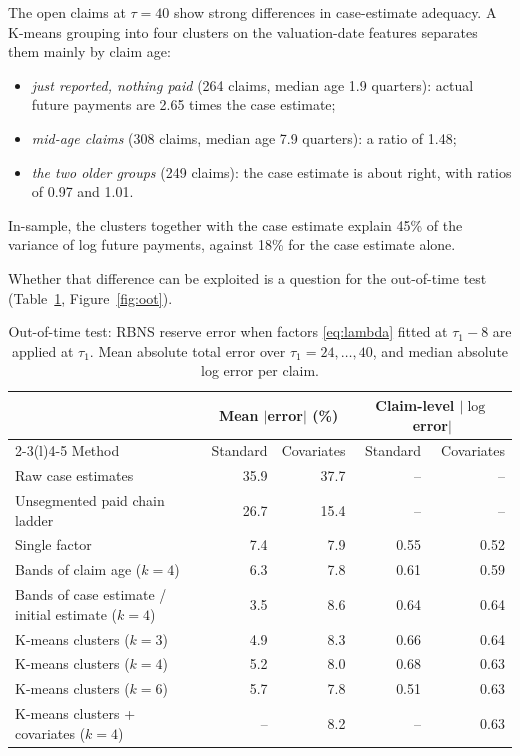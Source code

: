 The open claims at $\tau = 40$ show strong differences in case-estimate adequacy. A K-means grouping into four clusters on the valuation-date features separates them mainly by claim age:
\begin{itemize}[leftmargin=*]
\item \emph{just reported, nothing paid} (264 claims, median age 1.9 quarters): actual future payments are 2.65 times the case estimate;
\item \emph{mid-age claims} (308 claims, median age 7.9 quarters): a ratio of 1.48;
\item \emph{the two older groups} (249 claims): the case estimate is about right, with ratios of 0.97 and 1.01.
\end{itemize}
In-sample, the clusters together with the case estimate explain 45\% of the variance of log future payments, against 18\% for the case estimate alone.

Whether that difference can be exploited is a question for the out-of-time test (Table~\ref{tab:oot}, Figure~\ref{fig:oot}).

\begin{table}[!htbp]
\centering
\small
\caption{Out-of-time test: RBNS reserve error when factors \eqref{eq:lambda} fitted at $\tau_1 - 8$ are applied at $\tau_1$. Mean absolute total error over $\tau_1 = 24,\dots,40$, and median absolute log error per claim.}
\label{tab:oot}
\begin{tabular}{@{}lrrrr@{}}
\toprule
 & \multicolumn{2}{c}{Mean $|$error$|$ (\%)} & \multicolumn{2}{c}{Claim-level $|\log$ error$|$} \\
\cmidrule(lr){2-3}\cmidrule(l){4-5}
Method & Standard & Covariates & Standard & Covariates \\
\midrule
Raw case estimates & 35.9 & 37.7 & -- & -- \\
Unsegmented paid chain ladder & 26.7 & 15.4 & -- & -- \\
Single factor & 7.4 & 7.9 & 0.55 & 0.52 \\
Bands of claim age ($k=4$) & 6.3 & 7.8 & 0.61 & 0.59 \\
Bands of case estimate / initial estimate ($k=4$) & 3.5 & 8.6 & 0.64 & 0.64 \\
K-means clusters ($k=3$) & 4.9 & 8.3 & 0.66 & 0.64 \\
K-means clusters ($k=4$) & 5.2 & 8.0 & 0.68 & 0.63 \\
K-means clusters ($k=6$) & 5.7 & 7.8 & 0.51 & 0.63 \\
K-means clusters + covariates ($k=4$) & -- & 8.2 & -- & 0.63 \\
\bottomrule
\end{tabular}
\end{table}

